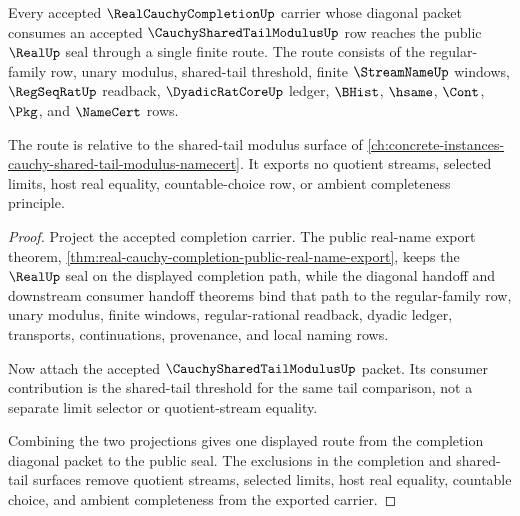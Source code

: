 \begin{theorem}
\label{thm:real-cauchy-completion-shared-tail-modulus-consumer-route}
Every accepted $\RealCauchyCompletionUp$ carrier whose diagonal packet consumes an accepted $\CauchySharedTailModulusUp$ row reaches the public $\RealUp$ seal through a single finite route. The route consists of the regular-family row, unary modulus, shared-tail threshold, finite $\StreamNameUp$ windows, $\RegSeqRatUp$ readback, $\DyadicRatCoreUp$ ledger, $\BHist$, $\hsame$, $\Cont$, $\Pkg$, and $\NameCert$ rows.

The route is relative to the shared-tail modulus surface of \autoref{ch:concrete-instances-cauchy-shared-tail-modulus-namecert}. It exports no quotient streams, selected limits, host real equality, countable-choice row, or ambient completeness principle.
\end{theorem}
\begin{proof}
Project the accepted completion carrier. The public real-name export theorem, \autoref{thm:real-cauchy-completion-public-real-name-export}, keeps the $\RealUp$ seal on the displayed completion path, while the diagonal handoff and downstream consumer handoff theorems bind that path to the regular-family row, unary modulus, finite windows, regular-rational readback, dyadic ledger, transports, continuations, provenance, and local naming rows.

Now attach the accepted $\CauchySharedTailModulusUp$ packet. Its consumer contribution is the shared-tail threshold for the same tail comparison, not a separate limit selector or quotient-stream equality.

Combining the two projections gives one displayed route from the completion diagonal packet to the public seal. The exclusions in the completion and shared-tail surfaces remove quotient streams, selected limits, host real equality, countable choice, and ambient completeness from the exported carrier.
\end{proof}


